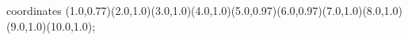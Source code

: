 					coordinates { (1.0,0.77)(2.0,1.0)(3.0,1.0)(4.0,1.0)(5.0,0.97)(6.0,0.97)(7.0,1.0)(8.0,1.0)(9.0,1.0)(10.0,1.0)};